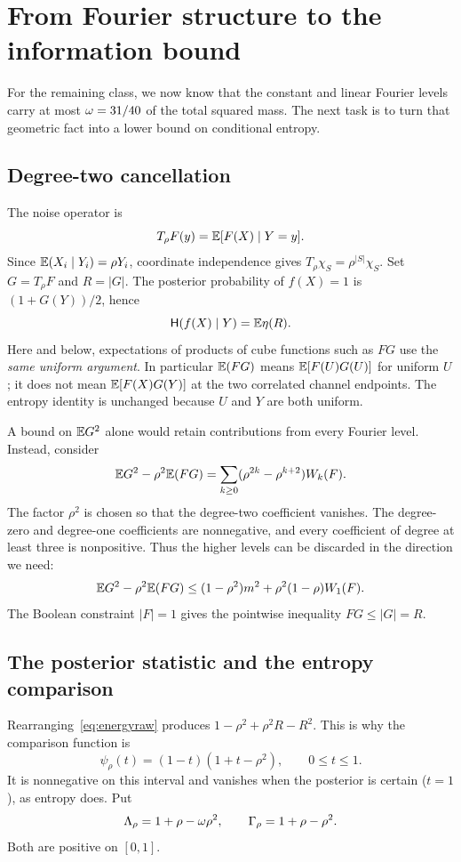 \section{From Fourier structure to the information bound}\label{sec:energy}
For the remaining class, we now know that the constant and linear Fourier levels carry at most $\omega=31/40$ of the total squared mass. The next task is to turn that geometric fact into a lower bound on conditional entropy.

\subsection{Degree-two cancellation}
The noise operator is
\[
T_\rho F(y)=\mathbb E[F(X)\mid Y=y].
\]
Since $\mathbb E(X_i\mid Y_i)=\rho Y_i$, coordinate independence gives
$T_\rho\chi_S=\rho^{|S|}\chi_S$.
Set $G=T_\rho F$ and $R=|G|$. The posterior probability of $f(X)=1$ is $(1+G(Y))/2$, hence
\begin{equation}\label{eq:posteriorentropy}
\mathsf H(f(X)\mid Y)=\mathbb E\eta(R).
\end{equation}
Here and below, expectations of products of cube functions such as $FG$ use the \emph{same uniform argument}. In particular $\mathbb E(FG)$ means $\mathbb E[F(U)G(U)]$ for uniform $U$; it does not mean $\mathbb E[F(X)G(Y)]$ at the two correlated channel endpoints. The entropy identity is unchanged because $U$ and $Y$ are both uniform.

A bound on $\mathbb E G^2$ alone would retain contributions from every Fourier level. Instead, consider
\begin{equation}\label{eq:cancellation}
\mathbb E G^2-\rho^2\mathbb E(FG)
=\sum_{k\ge0}(\rho^{2k}-\rho^{k+2})W_k(F).
\end{equation}
The factor $\rho^2$ is chosen so that the degree-two coefficient vanishes. The degree-zero and degree-one coefficients are nonnegative, and every coefficient of degree at least three is nonpositive. Thus the higher levels can be discarded in the direction we need:
\begin{equation}\label{eq:energyraw}
\mathbb E G^2-\rho^2\mathbb E(FG)
\le(1-\rho^2)m^2+\rho^2(1-\rho)W_1(F).
\end{equation}
The Boolean constraint $|F|=1$ gives the pointwise inequality $FG\le|G|=R$.

\subsection{The posterior statistic and the entropy comparison}
Rearranging~\eqref{eq:energyraw} produces $1-\rho^2+\rho^2R-R^2$. This is why the comparison function is
\begin{equation}\label{eq:psi}
\psi_\rho(t)=(1-t)(1+t-\rho^2),\qquad 0\le t\le1.
\end{equation}
It is nonnegative on this interval and vanishes when the posterior is certain ($t=1$), as entropy does. Put
\begin{equation}\label{eq:LambdaGamma}
\Lambda_\rho=1+\rho-\omega\rho^2,\qquad
\Gamma_\rho=1+\rho-\rho^2.
\end{equation}
Both are positive on $[0,1]$.

